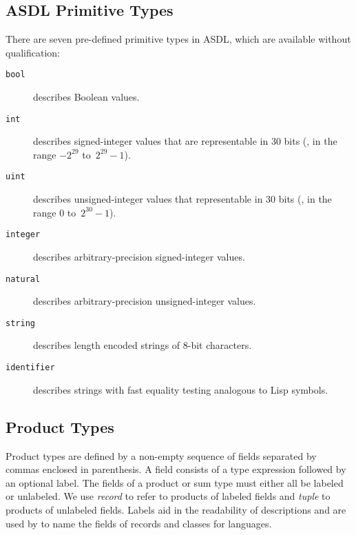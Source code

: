 \subsection{ASDL Primitive Types}
There are seven pre-defined primitive types in ASDL, which are available without qualification:
\begin{description}
  \item[\normalfont\texttt{\color{\cdColor}bool}] describes Boolean values.
  \item[\normalfont\texttt{\color{\cdColor}int}] describes signed-integer values that are representable in 30 bits
    (\ie{}, in the range ${-}2^{29}$ to~\mbox{$2^{29}-1$}).
  \item[\normalfont\texttt{\color{\cdColor}uint}] describes unsigned-integer values that representable in 30 bits
    (\ie{}, in the range $0$ to~$2^{30}-1$).
  \item[\normalfont\texttt{\color{\cdColor}integer}] describes arbitrary-precision signed-integer values.
  \item[\normalfont\texttt{\color{\cdColor}natural}] describes arbitrary-precision unsigned-integer values.
  \item[\normalfont\texttt{\color{\cdColor}string}] describes length encoded strings of 8-bit characters.
  \item[\normalfont\texttt{\color{\cdColor}identifier}] describes strings with fast equality testing
    analogous to Lisp symbols.
\end{description}%


\subsection{Product Types}
Product types are defined by a non-empty  sequence of fields separated by
commas enclosed in parenthesis.
A field consists of a type expression followed by an optional label.
The fields of a product or sum type must either all be labeled or unlabeled.
We use \emph{record} to refer to products of labeled fields and \emph{tuple}
to products of unlabeled fields.
Labels aid in the readability of
descriptions and are used by \asdlgen{} to name the fields of records
and classes for languages.

